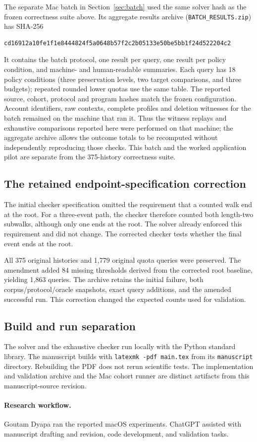 The separate Mac batch in Section~\ref{sec:batch} used the same solver hash
as the frozen correctness suite above. Its aggregate results archive
(\texttt{BATCH\_RESULTS.zip}) has SHA-256
\begin{lstlisting}
cd16912a10fe1f1e8444824f5a0648b57f2c2b05133e50be5bb1f24d522204c2
\end{lstlisting}
It contains the batch protocol, one result per query, one result per policy
condition, and machine- and human-readable summaries. Each query has 18
policy conditions (three preservation levels, two target comparisons, and
three budgets); repeated rounded lower quotas use the same table. The
reported source, cohort, protocol and program hashes match the frozen
configuration. Account identifiers, raw contexts, complete profiles and
deletion witnesses for the batch remained on the machine that ran it. Thus
the witness replays and exhaustive comparisons reported here were performed
on that machine; the aggregate archive allows the outcome totals to be
recomputed without independently reproducing those checks. This batch and
the worked application pilot are separate from the 375-history correctness
suite.

\subsection{The retained endpoint-specification correction}

The initial checker specification omitted the requirement that a counted walk
end at the root. For a three-event path, the checker therefore counted both
length-two subwalks, although only one ends at the root. The solver already
enforced this requirement and did not change. The corrected checker tests
whether the final event ends at the root.

All 375 original histories and 1,779 original quota queries were preserved.
The amendment added 84 missing thresholds derived from the corrected root
baseline, yielding 1,863 queries. The archive retains the initial failure,
both corpus/protocol/oracle snapshots, exact query additions, and the amended
successful run. This correction changed the expected counts used for validation.

\subsection{Build and run separation}

The solver and the exhaustive checker run locally with the Python standard library. The manuscript builds with
\texttt{latexmk -pdf main.tex} from its \texttt{manuscript} directory.
Rebuilding the PDF does not rerun scientific tests. The implementation and
validation archive and the Mac cohort runner are distinct artifacts from
this manuscript-source revision.

\paragraph{Research workflow.}
Goutam Dyapa ran the reported macOS experiments. ChatGPT assisted with
manuscript drafting and revision, code development, and validation tasks.
